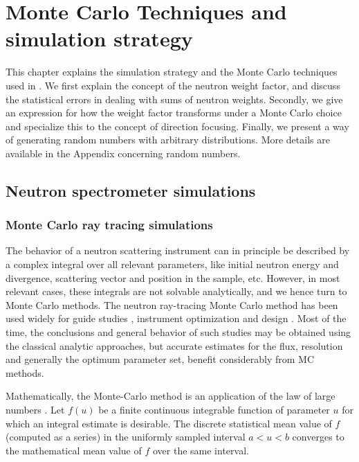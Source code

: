 \chapter{Monte Carlo Techniques and simulation strategy}
\label{s:MCtechniques}

\newcommand{\Ombold}{\boldsymbol{\Omega}}

This chapter explains the simulation strategy and the Monte Carlo
techniques used in \MCS. We first explain the concept of the neutron
weight factor, and discuss the statistical errors in dealing with sums
of neutron weights.  Secondly, we give an expression for how the weight
factor transforms under a Monte Carlo choice and specialize this
to the concept of direction focusing.  Finally, we present a way of
generating random numbers with arbitrary distributions.
More details are available in the Appendix concerning random numbers.


\section{Neutron spectrometer simulations}

\subsection{Monte Carlo ray tracing simulations}
The behavior of a neutron scattering instrument can in principle be described by a complex integral over all relevant parameters, like initial neutron energy and divergence, scattering vector and position in the sample, etc. However, in most relevant cases, these integrals are not solvable analytically, and we hence turn to Monte Carlo methods. The neutron ray-tracing Monte Carlo method has been used widely for guide studies \cite{Copley93,Farhi02,Schanzer04}, instrument optimization and design \cite{Zsigmond04,Lieutenant05}. Most of the time, the conclusions and general behavior of such studies may be obtained using the classical analytic approaches, but accurate estimates for the flux, resolution and generally the optimum parameter set, benefit considerably from MC methods.

Mathematically, the Monte-Carlo method is an application of the law of large numbers \cite{James80,Grimmett92}. Let $f(u)$ be a finite continuous integrable function of parameter $u$ for which an integral estimate is desirable. The discrete statistical mean value of $f$ (computed as a series) in the uniformly sampled interval $a < u < b$ converges to the mathematical mean value of $f$ over the same interval.

